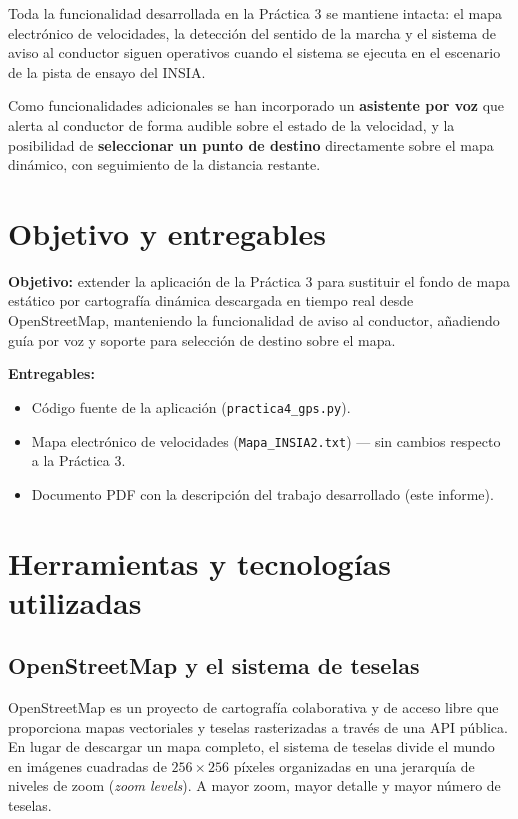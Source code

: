 \documentclass[10pt]{article}
\begin{document}
Toda la funcionalidad desarrollada en la Práctica 3 se mantiene intacta: el mapa electrónico de velocidades, la detección del sentido de la marcha y el sistema de aviso al conductor siguen operativos cuando el sistema se ejecuta en el escenario de la pista de ensayo del INSIA.

Como funcionalidades adicionales se han incorporado un \textbf{asistente por voz} que alerta al conductor de forma audible sobre el estado de la velocidad, y la posibilidad de \textbf{seleccionar un punto de destino} directamente sobre el mapa dinámico, con seguimiento de la distancia restante.

\section{Objetivo y entregables}

\textbf{Objetivo:} extender la aplicación de la Práctica 3 para sustituir el fondo de mapa estático por cartografía dinámica descargada en tiempo real desde OpenStreetMap, manteniendo la funcionalidad de aviso al conductor, añadiendo guía por voz y soporte para selección de destino sobre el mapa.

\textbf{Entregables:}
\begin{itemize}[leftmargin=1.2em]
    \item Código fuente de la aplicación (\texttt{practica4\_gps.py}).
    \item Mapa electrónico de velocidades (\texttt{Mapa\_INSIA2.txt}) — sin cambios respecto a la Práctica 3.
    \item Documento PDF con la descripción del trabajo desarrollado (este informe).
\end{itemize}

\section{Herramientas y tecnologías utilizadas}

\subsection{OpenStreetMap y el sistema de teselas}

OpenStreetMap es un proyecto de cartografía colaborativa y de acceso libre que proporciona mapas vectoriales y teselas rasterizadas a través de una API pública. En lugar de descargar un mapa completo, el sistema de teselas divide el mundo en imágenes cuadradas de $256 \times 256$ píxeles organizadas en una jerarquía de niveles de zoom (\textit{zoom levels}). A mayor zoom, mayor detalle y mayor número de teselas.
\end{document}
